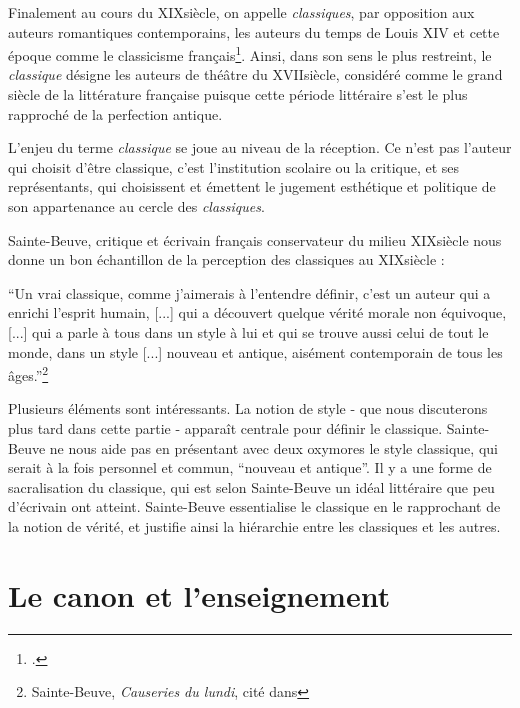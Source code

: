 Finalement au cours du XIX\ieme siècle, on appelle \textit{classiques}, par opposition aux auteurs romantiques contemporains, les auteurs du temps de Louis XIV et cette époque comme le classicisme français\footcites{viala_quest-ce_1993}. Ainsi, dans son sens le plus restreint, le \textit{classique} désigne les auteurs de théâtre du XVII\ieme siècle, considéré comme le grand siècle de la littérature française puisque cette période littéraire s'est le plus rapproché de la perfection antique.

L'enjeu du terme \textit{classique} se joue au niveau de la réception. Ce n'est pas l'auteur qui choisit d'être classique, c'est l'institution scolaire ou la critique, et ses représentants, qui choisissent et émettent le jugement esthétique et politique de son appartenance au cercle des \textit{classiques}.

Sainte-Beuve, critique et écrivain français conservateur du milieu XIX\ieme siècle nous donne un bon échantillon de la perception des classiques au XIX\ieme siècle :
\begin{displayquote} \enquote{Un vrai classique, comme j'aimerais à l'entendre définir, c'est un auteur qui a enrichi l'esprit humain, [...] qui a découvert quelque vérité morale non équivoque, [...] qui a parle à tous dans un style à lui et qui se trouve aussi celui de tout le monde, dans un style [...] nouveau et antique, aisément contemporain de tous les âges.}\footnote{Sainte-Beuve, \textit{Causeries du lundi}, cité dans\cite{compagnon_sainte-beuve_1995}}
\end{displayquote}
Plusieurs éléments sont intéressants. La notion de style - que nous discuterons plus tard dans cette partie - apparaît centrale pour définir le classique. Sainte-Beuve ne nous aide pas en présentant avec deux oxymores le style classique, qui serait à la fois personnel et commun, \enquote{nouveau et antique}. Il y a une forme de sacralisation du classique, qui est selon Sainte-Beuve un idéal littéraire que peu d'écrivain ont atteint. Sainte-Beuve essentialise le classique en le rapprochant de la notion de vérité, et justifie ainsi la hiérarchie entre les classiques et les autres.


\section{Le canon et l'enseignement}

